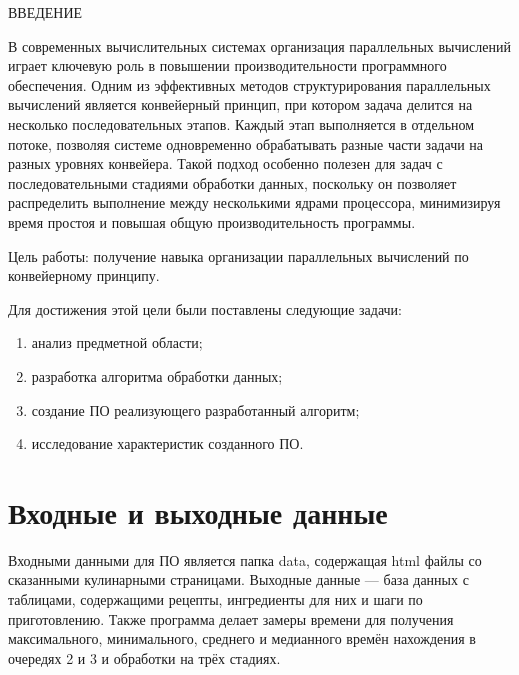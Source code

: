 \begin{center}
    \MakeUppercase{Введение}
\end{center}

В современных вычислительных системах организация параллельных вычислений играет ключевую роль в повышении производительности программного обеспечения. Одним из эффективных методов структурирования параллельных вычислений является конвейерный принцип, при котором задача делится на несколько последовательных этапов. Каждый этап выполняется в отдельном потоке, позволяя системе одновременно обрабатывать разные части задачи на разных уровнях конвейера. Такой подход особенно полезен для задач с последовательными стадиями обработки данных, поскольку он позволяет распределить выполнение между несколькими ядрами процессора, минимизируя время простоя и повышая общую производительность программы.
\vspace{0.25cm}

Цель работы: получение навыка организации параллельных вычислений по конвейерному принципу.

\vspace{0.25cm}
Для достижения этой цели были поставлены следующие задачи:

\begin{enumerate}[label=\arabic*)]

\item анализ предметной области;
\item разработка алгоритма обработки данных;
\item создание ПО реализующего разработанный алгоритм;
\item исследование характеристик созданного ПО.

\end{enumerate}

\section{Входные и выходные данные}

\hspace{1.25cm}
Входными данными для ПО является папка data, содержащая html файлы со сказанными кулинарными страницами. Выходные данные --- база данных с таблицами, содержащими рецепты, ингредиенты для них и шаги по приготовлению. Также программа делает замеры времени для получения максимального, минимального, среднего и медианного времён нахождения в очередях 2 и 3 и обработки на трёх стадиях.

